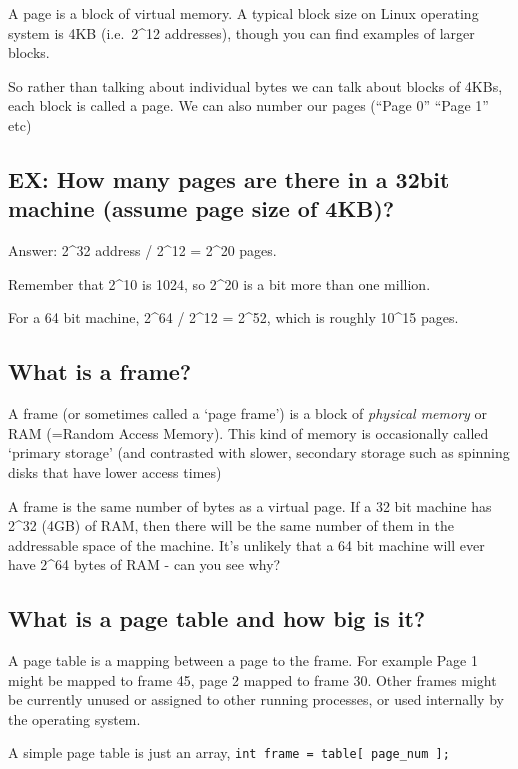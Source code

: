 A page is a block of virtual memory. A typical block size on Linux
operating system is 4KB (i.e.~2\^{}12 addresses), though you can find
examples of larger blocks.

So rather than talking about individual bytes we can talk about blocks
of 4KBs, each block is called a page. We can also number our pages
(``Page 0'' ``Page 1'' etc)

\subsection{EX: How many pages are there in a 32bit machine (assume page
size of
4KB)?}\label{ex-how-many-pages-are-there-in-a-32bit-machine-assume-page-size-of-4kb}

Answer: 2\^{}32 address / 2\^{}12 = 2\^{}20 pages.

Remember that 2\^{}10 is 1024, so 2\^{}20 is a bit more than one
million.

For a 64 bit machine, 2\^{}64 / 2\^{}12 = 2\^{}52, which is roughly
10\^{}15 pages.

\subsection{What is a frame?}\label{what-is-a-frame}

A frame (or sometimes called a `page frame') is a block of
\emph{physical memory} or RAM (=Random Access Memory). This kind of
memory is occasionally called `primary storage' (and contrasted with
slower, secondary storage such as spinning disks that have lower access
times)

A frame is the same number of bytes as a virtual page. If a 32 bit
machine has 2\^{}32 (4GB) of RAM, then there will be the same number of
them in the addressable space of the machine. It's unlikely that a 64
bit machine will ever have 2\^{}64 bytes of RAM - can you see why?

\subsection{What is a page table and how big is
it?}\label{what-is-a-page-table-and-how-big-is-it}

A page table is a mapping between a page to the frame. For example Page
1 might be mapped to frame 45, page 2 mapped to frame 30. Other frames
might be currently unused or assigned to other running processes, or
used internally by the operating system.

A simple page table is just an array,
\texttt{int\ frame\ =\ table{[}\ page\_num\ {]};}


